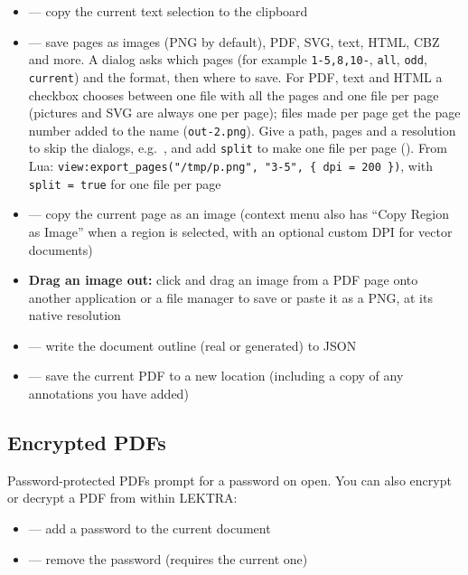 \documentclass[a4paper,12pt]{article}
\begin{document}
\begin{itemize}[leftmargin=*]
    \item {} — copy the current text selection to the clipboard
    \item {} — save pages as images (PNG by default), PDF, SVG, text, HTML, CBZ and more. A dialog asks which pages (for example \texttt{1-5,8,10-}, \texttt{all}, \texttt{odd}, \texttt{current}) and the format, then where to save. For PDF, text and HTML a checkbox chooses between one file with all the pages and one file per page (pictures and SVG are always one per page); files made per page get the page number added to the name (\texttt{out-2.png}). Give a path, pages and a resolution to skip the dialogs, e.g.\ , and add \texttt{split} to make one file per page (). From Lua: \texttt{view:export\_pages("/tmp/p.png", "3-5", \{ dpi = 200 \})}, with \texttt{split = true} for one file per page
    \item {} — copy the current page as an image (context menu also has ``Copy Region as Image'' when a region is selected, with an optional custom DPI for vector documents)
    \item \textbf{Drag an image out:} click and drag an image from a PDF page onto another application or a file manager to save or paste it as a PNG, at its native resolution
    \item {} — write the document outline (real or generated) to JSON
    \item {} — save the current PDF to a new location (including a copy of any annotations you have added)
\end{itemize}

\subsection{Encrypted PDFs}

Password-protected PDFs prompt for a password on open. You can also encrypt or decrypt a PDF from within LEKTRA:
\begin{itemize}[leftmargin=*]
    \item {} — add a password to the current document
    \item {} — remove the password (requires the current one)
\end{itemize}
\end{document}
